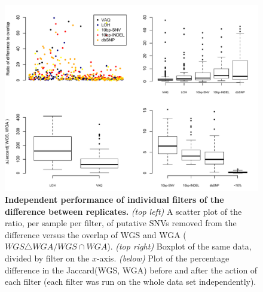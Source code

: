 \documentclass[11 pt]{article} %
\begin{document}
\begin{figure}
\centerline{
\includegraphics[width=5in]{Figure5.pdf} }
\caption{\textbf{Independent performance of individual filters of the difference between replicates.} \textit{(top left)} A scatter plot of the ratio, per sample per filter, of putative SNVs removed from the difference versus the overlap of WGS and WGA ($WGS \triangle WGA / WGS \cap WGA$). \textit{(top right)} Boxplot of the same data, divided by filter on the $x$-axis. \textit{(below)} Plot of the percentage difference in the Jaccard(WGS, WGA) before and after the action of each filter (each filter was run on the whole data set independently).}
\label{fig:diffset}
\end{figure}
\end{document}
